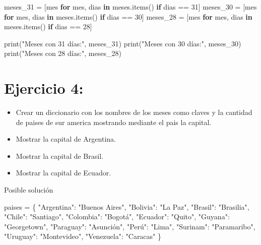 \documentclass[
  a4paper,
  DIV=11,
  numbers=noendperiod,
  onepage,
  openany]{scrreprt}
\newenvironment{Shaded}{\begin{snugshade}}{\end{snugshade}}
\newcommand{\BuiltInTok}[1]{\textcolor[rgb]{0.00,0.23,0.31}{#1}}
\newcommand{\ControlFlowTok}[1]{\textcolor[rgb]{0.00,0.23,0.31}{\textbf{#1}}}
\newcommand{\DecValTok}[1]{\textcolor[rgb]{0.68,0.00,0.00}{#1}}
\newcommand{\KeywordTok}[1]{\textcolor[rgb]{0.00,0.23,0.31}{\textbf{#1}}}
\newcommand{\NormalTok}[1]{\textcolor[rgb]{0.00,0.23,0.31}{#1}}
\newcommand{\OperatorTok}[1]{\textcolor[rgb]{0.37,0.37,0.37}{#1}}
\newcommand{\StringTok}[1]{\textcolor[rgb]{0.13,0.47,0.30}{#1}}
\providecommand{\tightlist}{%
  \setlength{\itemsep}{0pt}\setlength{\parskip}{0pt}}\usepackage{longtable,booktabs,array}
\begin{document}
\begin{tcolorbox}
\begin{Shaded}
\begin{Highlighting}[]
\NormalTok{meses\_31 }\OperatorTok{=}\NormalTok{ [mes }\ControlFlowTok{for}\NormalTok{ mes, dias }\KeywordTok{in}\NormalTok{ meses.items() }\ControlFlowTok{if}\NormalTok{ dias }\OperatorTok{==} \DecValTok{31}\NormalTok{]}
\NormalTok{meses\_30 }\OperatorTok{=}\NormalTok{ [mes }\ControlFlowTok{for}\NormalTok{ mes, dias }\KeywordTok{in}\NormalTok{ meses.items() }\ControlFlowTok{if}\NormalTok{ dias }\OperatorTok{==} \DecValTok{30}\NormalTok{]}
\NormalTok{meses\_28 }\OperatorTok{=}\NormalTok{ [mes }\ControlFlowTok{for}\NormalTok{ mes, dias }\KeywordTok{in}\NormalTok{ meses.items() }\ControlFlowTok{if}\NormalTok{ dias }\OperatorTok{==} \DecValTok{28}\NormalTok{]}

\BuiltInTok{print}\NormalTok{(}\StringTok{"Meses con 31 días:"}\NormalTok{, meses\_31)}
\BuiltInTok{print}\NormalTok{(}\StringTok{"Meses con 30 días:"}\NormalTok{, meses\_30)}
\BuiltInTok{print}\NormalTok{(}\StringTok{"Meses con 28 días:"}\NormalTok{, meses\_28)}
\end{Highlighting}
\end{Shaded}

\section{Ejercicio 4:}\label{ejercicio-4-4}

\begin{itemize}
\tightlist
\item
  Crear un diccionario con los nombres de los meses como claves y la
  cantidad de paises de sur america mostrando mediante el pais la
  capital.
\item
  Mostrar la capital de Argentina.
\item
  Mostrar la capital de Brasil.
\item
  Mostrar la capital de Ecuador.
\end{itemize}

Posible solución

\begin{Shaded}
\begin{Highlighting}[]
\NormalTok{paises }\OperatorTok{=}\NormalTok{ \{}
    \StringTok{"Argentina"}\NormalTok{: }\StringTok{"Buenos Aires"}\NormalTok{,}
    \StringTok{"Bolivia"}\NormalTok{: }\StringTok{"La Paz"}\NormalTok{,}
    \StringTok{"Brasil"}\NormalTok{: }\StringTok{"Brasilia"}\NormalTok{,}
    \StringTok{"Chile"}\NormalTok{: }\StringTok{"Santiago"}\NormalTok{,}
    \StringTok{"Colombia"}\NormalTok{: }\StringTok{"Bogotá"}\NormalTok{,}
    \StringTok{"Ecuador"}\NormalTok{: }\StringTok{"Quito"}\NormalTok{,}
    \StringTok{"Guyana"}\NormalTok{: }\StringTok{"Georgetown"}\NormalTok{,}
    \StringTok{"Paraguay"}\NormalTok{: }\StringTok{"Asunción"}\NormalTok{,}
    \StringTok{"Perú"}\NormalTok{: }\StringTok{"Lima"}\NormalTok{,}
    \StringTok{"Surinam"}\NormalTok{: }\StringTok{"Paramaribo"}\NormalTok{,}
    \StringTok{"Uruguay"}\NormalTok{: }\StringTok{"Montevideo"}\NormalTok{,}
    \StringTok{"Venezuela"}\NormalTok{: }\StringTok{"Caracas"}
\NormalTok{\}}


\end{Highlighting}
\end{Shaded}
\end{tcolorbox}
\end{document}
